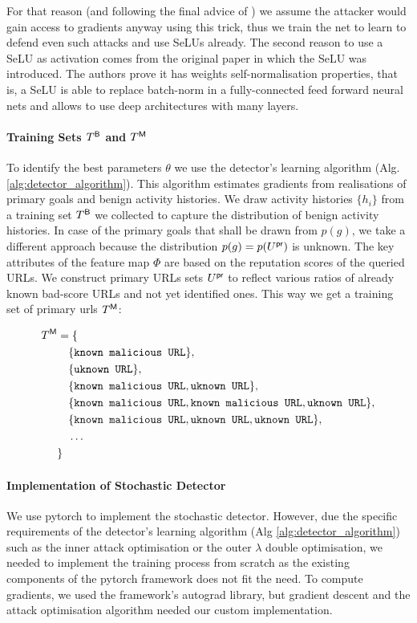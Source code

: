 For that reason (and following the final advice of \cite{obfuscated_gradients}) we assume the attacker would gain access to gradients anyway using this trick, thus we train the net to learn to defend even such attacks and use SeLUs already. The second reason to use a SeLU as activation comes from the original paper \cite{selu} in which the SeLU was introduced. The authors prove it has weights self-normalisation properties, that is, a SeLU is able to replace batch-norm \cite{batch-norm} in a fully-connected feed forward neural nets and allows to use deep architectures with many layers.

\paragraph{Training Sets  $T^{\mathsf{B}}$ and  $T^{\mathsf{M}}$}\label{sec:training_set}
To identify the best parameters $\theta$ we use the detector's learning algorithm (Alg. \ref{alg:detector_algorithm}). This algorithm estimates gradients from realisations of primary goals and benign activity histories. We draw activity histories $\{ h_i \}$ from a training set $T^{\mathsf{B}}$ we collected to capture the distribution of benign activity histories. In case of the primary goals that shall be drawn from $p(g)$, we take a different approach because the distribution $p(g) = p(U^{\mathsf{pr}})$ is unknown. The key attributes of  the feature map $\Phi$ are based on the reputation scores of the queried URLs. We construct primary URLs sets $U^{\mathsf{pr}}$ to reflect various ratios of already known bad-score URLs and not yet identified ones. This way we get a training set of primary urls $T^{\mathsf{M}}$:

\begin{align*}
    T^{\mathsf{M}} &= \{ \\
        & \quad \{ \texttt{known malicious URL} \}, \\
        & \quad \{ \texttt{uknown URL} \}, \\
        & \quad \{ \texttt{known malicious URL}, \texttt{uknown URL} \}, \\
        & \quad \{ \texttt{known malicious URL}, \texttt{known malicious URL}, \texttt{uknown URL} \}, \\
        & \quad \{ \texttt{known malicious URL}, \texttt{uknown URL}, \texttt{uknown URL} \}, \\
        & \quad \dots \\\
    &\}
\end{align*}

\paragraph{Implementation of Stochastic Detector}
We use pytorch \cite{pytorch} to implement the stochastic detector. However, due the specific requirements of the detector's learning algorithm (Alg \ref{alg:detector_algorithm}) such as the inner attack optimisation or the outer $\lambda$ double optimisation, we needed to implement the training process from scratch as the existing components of the pytorch framework does not fit the need. To compute gradients, we used the framework's autograd library, but gradient descent and the attack optimisation algorithm needed our custom implementation.

